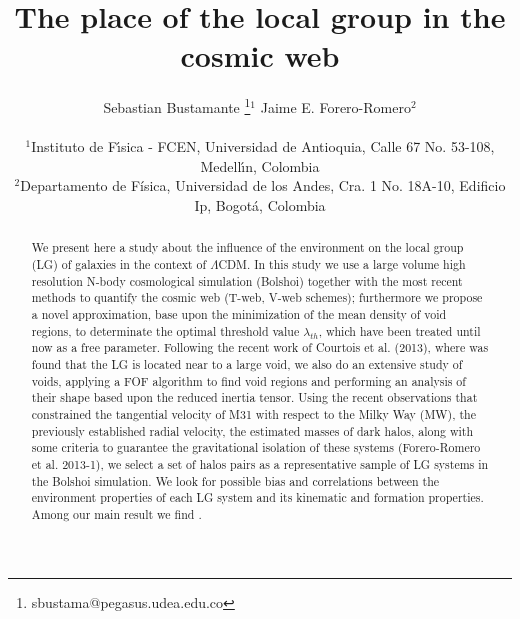 \documentclass[usenatbib]{latex/mn2e}
\begin{document}
\title{The place of the local group in the cosmic web}
\author[S. Bustamante and J.E. Forero-Romero]{
\parbox[t]{\textwidth}{\raggedright 
  Sebastian Bustamante \thanks{sbustama@pegasus.udea.edu.co}$^{1}$ 
  Jaime E. Forero-Romero$^{2}$ 
}
\vspace*{6pt}\\
$^1$Instituto de F\'{\i}sica - FCEN, Universidad de Antioquia, Calle
67 No. 53-108, Medell\'{\i}n, Colombia\\ 
$^2$Departamento de F\'{i}sica, Universidad de los Andes, Cra. 1
No. 18A-10, Edificio Ip, Bogot\'a, Colombia
}

\maketitle

\begin{abstract}


We present here a study about the influence of the environment on the
local group (LG) of galaxies in the context of $\Lambda$CDM. In this study 
we use a large volume high resolution N-body cosmological simulation 
(Bolshoi) together with the most recent methods to quantify the cosmic web 
(T-web, V-web schemes); furthermore we propose a novel approximation, base
upon the minimization of the mean density of void regions, to determinate 
the optimal threshold value $\lambda_{th}$, which have been treated until 
now as a free parameter. 
Following the recent work of Courtois et al. (2013), where was 
found that the LG is located near to a large void, we also do an extensive 
study of voids, applying a FOF algorithm to find void regions and 
performing an analysis of their shape based upon the reduced inertia 
tensor.
Using the recent observations that constrained the tangential velocity of
M31 with respect to the Milky Way (MW), the previously established radial 
velocity, the estimated masses of dark halos, along with some criteria
to guarantee the gravitational isolation of these systems (Forero-Romero
et al. 2013-1), we select a set of halos pairs as a representative sample 
of LG systems in the Bolshoi simulation. 
We look for possible bias and correlations between the environment 
properties of each LG system and its kinematic and formation properties. 
Among our main result we find .

\end{abstract}
\end{document}
